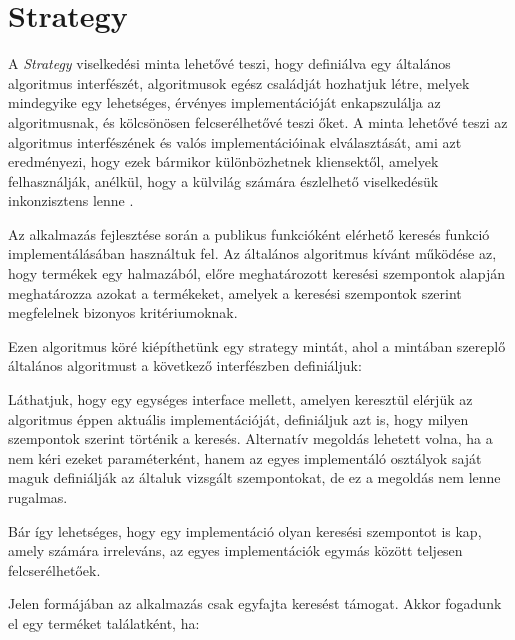 \section{Strategy}

A \emph{Strategy} viselkedési minta lehetővé teszi, hogy definiálva egy általános algoritmus interfészét, algoritmusok egész családját hozhatjuk létre, melyek mindegyike egy lehetséges, érvényes implementációját enkapszulálja az algoritmusnak, és kölcsönösen felcserélhetővé teszi őket. A minta lehetővé teszi az algoritmus interfészének és valós implementációinak elválasztását, ami azt eredményezi, hogy ezek bármikor különbözhetnek kliensektől, amelyek felhasználják, anélkül, hogy a külvilág számára észlelhető viselkedésük inkonzisztens lenne \cite{gamma1995elements}. \par


Az alkalmazás fejlesztése során a publikus funkcióként elérhető keresés funkció implementálásában használtuk fel. Az általános algoritmus kívánt működése az, hogy termékek egy halmazából, előre meghatározott keresési szempontok alapján meghatározza azokat a termékeket, amelyek a keresési szempontok szerint megfelelnek bizonyos kritériumoknak. \par

Ezen algoritmus köré kiépíthetünk egy strategy mintát, ahol a mintában szereplő általános algoritmust a következő interfészben definiáljuk: 


Láthatjuk, hogy egy egységes interface mellett, amelyen keresztül elérjük az algoritmus éppen aktuális implementációját, definiáljuk azt is, hogy milyen szempontok szerint történik a keresés. Alternatív megoldás lehetett volna, ha a  nem kéri ezeket paraméterként, hanem az egyes implementáló osztályok saját maguk definiálják az általuk vizsgált szempontokat, de ez a megoldás nem lenne rugalmas. \par

 Bár így lehetséges, hogy egy implementáció olyan keresési szempontot is kap, amely számára irreleváns, az egyes implementációk egymás között teljesen felcserélhetőek. \par
 
 Jelen formájában az alkalmazás csak egyfajta keresést támogat. Akkor fogadunk el egy terméket találatként, ha:
 
